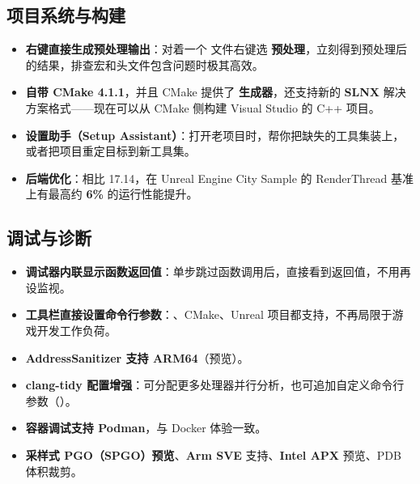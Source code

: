 \subsection{项目系统与构建}
\begin{itemize}
  \item \textbf{右键直接生成预处理输出}：对着一个  文件右键选 \textbf{预处理}，立刻得到预处理后的结果，排查宏和头文件包含问题时极其高效。
  \item \textbf{自带 CMake 4.1.1}，并且 CMake 提供了 \textbf{ 生成器}，还支持新的 \textbf{SLNX} 解决方案格式——现在可以从 CMake 侧构建 Visual Studio 的 C++ 项目。
  \item \textbf{设置助手（Setup Assistant）}：打开老项目时，帮你把缺失的工具集装上，或者把项目重定目标到新工具集。
  \item \textbf{后端优化}：相比 17.14，在 Unreal Engine City Sample 的 RenderThread 基准上有最高约 \textbf{6\%} 的运行性能提升。
\end{itemize}

\subsection{调试与诊断}
\begin{itemize}
  \item \textbf{调试器内联显示函数返回值}：单步跳过函数调用后，直接看到返回值，不用再设监视。
  \item \textbf{工具栏直接设置命令行参数}：、CMake、Unreal 项目都支持，不再局限于游戏开发工作负荷。
  \item \textbf{AddressSanitizer 支持 ARM64}（预览）。
  \item \textbf{clang-tidy 配置增强}：可分配更多处理器并行分析，也可追加自定义命令行参数（）。
  \item \textbf{容器调试支持 Podman}，与 Docker 体验一致。
  \item \textbf{采样式 PGO（SPGO）预览}、\textbf{Arm SVE} 支持、\textbf{Intel APX} 预览、PDB 体积裁剪。
\end{itemize}

